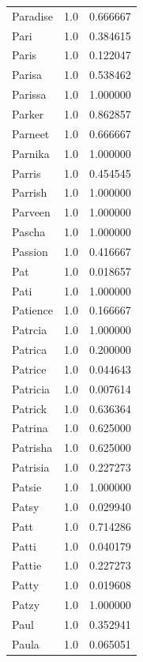 \documentclass[
  letterpaper,
  DIV=11,
  numbers=noendperiod]{scrreprt}
\begin{document}
\begin{tabular}{lrr}
Paradise        &   1.0 &   0.666667 \\
Pari            &   1.0 &   0.384615 \\
Paris           &   1.0 &   0.122047 \\
Parisa          &   1.0 &   0.538462 \\
Parissa         &   1.0 &   1.000000 \\
Parker          &   1.0 &   0.862857 \\
Parneet         &   1.0 &   0.666667 \\
Parnika         &   1.0 &   1.000000 \\
Parris          &   1.0 &   0.454545 \\
Parrish         &   1.0 &   1.000000 \\
Parveen         &   1.0 &   1.000000 \\
Pascha          &   1.0 &   1.000000 \\
Passion         &   1.0 &   0.416667 \\
Pat             &   1.0 &   0.018657 \\
Pati            &   1.0 &   1.000000 \\
Patience        &   1.0 &   0.166667 \\
Patrcia         &   1.0 &   1.000000 \\
Patrica         &   1.0 &   0.200000 \\
Patrice         &   1.0 &   0.044643 \\
Patricia        &   1.0 &   0.007614 \\
Patrick         &   1.0 &   0.636364 \\
Patrina         &   1.0 &   0.625000 \\
Patrisha        &   1.0 &   0.625000 \\
Patrisia        &   1.0 &   0.227273 \\
Patsie          &   1.0 &   1.000000 \\
Patsy           &   1.0 &   0.029940 \\
Patt            &   1.0 &   0.714286 \\
Patti           &   1.0 &   0.040179 \\
Pattie          &   1.0 &   0.227273 \\
Patty           &   1.0 &   0.019608 \\
Patzy           &   1.0 &   1.000000 \\
Paul            &   1.0 &   0.352941 \\
Paula           &   1.0 &   0.065051 \\

\end{tabular}
\end{document}
